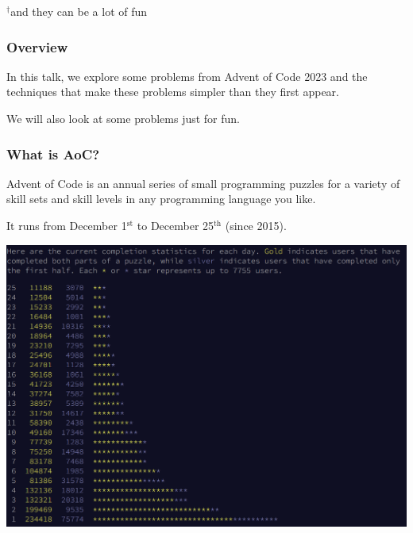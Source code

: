 \titlepage
\vfill
{\footnotesize $^\dagger$and they can be a lot of fun}

\begin{frame}
\frametitle{Overview}

In this talk, we explore some problems from Advent of Code 2023 and the techniques that make these problems simpler than they first appear.
\vspace{3em}

We will also look at some problems just for fun.

\end{frame}


\begin{frame}
\frametitle{What is AoC?}

Advent of Code is an annual series of small programming puzzles for a variety of skill sets and skill levels in any programming language you like.\vfill

It runs from December 1$^\text{st}$ to December 25$^\text{th}$ (since 2015).
\end{frame}

\begin{frame}

\begin{center}
\includegraphics[width=\textwidth]{stats}
\end{center}

\end{frame}



